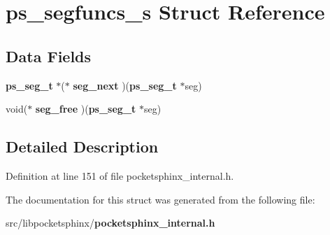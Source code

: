 \section{ps\-\_\-segfuncs\-\_\-s Struct Reference}
\label{structps__segfuncs__s}
\subsection*{Data Fields}
\begin{DoxyCompactItemize}
\item 
{\bf ps\-\_\-seg\-\_\-t} $\ast$($\ast$ {\bfseries seg\-\_\-next} )({\bf ps\-\_\-seg\-\_\-t} $\ast$seg)\label{structps__segfuncs__s_a8d9d7ccdb757620830d352d5fece4119}

\item 
void($\ast$ {\bfseries seg\-\_\-free} )({\bf ps\-\_\-seg\-\_\-t} $\ast$seg)\label{structps__segfuncs__s_abbc6c03c53212c4b973f3a0e4121e2ba}

\end{DoxyCompactItemize}


\subsection{Detailed Description}


Definition at line 151 of file pocketsphinx\-\_\-internal.\-h.



The documentation for this struct was generated from the following file\-:\begin{DoxyCompactItemize}
\item 
src/libpocketsphinx/{\bf pocketsphinx\-\_\-internal.\-h}\end{DoxyCompactItemize}
